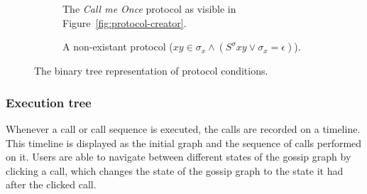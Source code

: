 \begin{figure}[htb!]
    \begin{subfigure}[t]{.45\linewidth}
        \centering
        \caption{The \emph{Call me Once} protocol as visible in Figure~\ref{fig:protocol-creator}.}
    \end{subfigure}
    \hfill
    \begin{subfigure}[t]{.5\linewidth}
        \centering
        \caption{A non-existant protocol (\( xy \in \sigma_x \land ( S^\sigma xy \lor \sigma_x = \epsilon ) \)).}
    \end{subfigure}
    \caption{The binary tree representation of protocol conditions.}
    \label{fig:logic-tree}
\end{figure}

\subsubsection{Execution tree}

Whenever a call or call sequence is executed, the calls are recorded on a timeline.
This timeline is displayed as the initial graph and the sequence of calls performed on it.
Users are able to navigate between different states of the gossip graph by clicking a call,
which changes the state of the gossip graph to the state it had after the clicked call.

